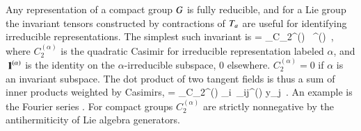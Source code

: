 Any representation of a compact group $G$ is fully
reducible, and for a Lie group
the invariant tensors constructed by contractions
of $T_a$ are useful for identifying irreducible
representations. The simplest such invariant is
\beq
\dual{\Lg} \cdot \Lg = \sum_\alpha C_2^{(\alpha)} \, \id^{(\alpha)}
\,,
where $C_2^{(\alpha)}$ is the quadratic Casimir for
irreducible representation labeled $\alpha$, and
${\ \hbox{{\rm 1}\kern-.6em\hbox{\rm 1}}}^{(\alpha)}$ is the identity on the $\alpha$-irreducible
subspace, 0 elsewhere. $ C_2^{(\alpha)} =0$ if $\alpha$
is an invariant subspace.
The dot product of two tangent fields
 is thus a sum of inner products
weighted by Casimirs,
\beq
{}
   = \sum_\alpha C_2^{(\alpha)} _i\, \delta_{ij}^{(\alpha)} y_j
\,.
An example is the Fourier series .
For compact groups $C_2^{(\alpha)}$ are strictly nonnegative by
the antihermiticity  of Lie algebra generators.

    \fi %

